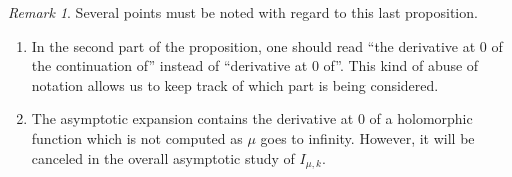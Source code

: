 \documentclass{jams-l}
\theoremstyle{definition}
\theoremstyle{remark}
\newtheorem{remark}[theorem]{Remark}
\numberwithin{equation}{section}
\begin{document}
            \begin{remark}
            
                Several points must be noted with regard to this last proposition.
                
                \begin{enumerate}
                    \item In the second part of the proposition, one should read ``the derivative at $0$ of the continuation of'' instead of ``derivative at $0$ of''. This kind of abuse of notation allows us to keep track of which part is being considered.
                    
                    \item The asymptotic expansion contains the derivative at $0$ of a holomorphic function which is not computed as $\mu$ goes to infinity. However, it will be canceled in the overall asymptotic study of $I_{\mu,k}$.
                \end{enumerate}
            
            \end{remark}
            
\end{document}
